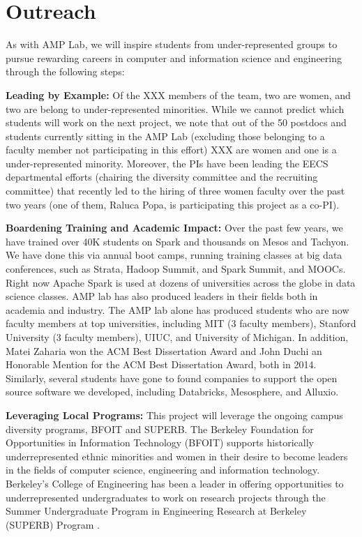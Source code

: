 \section{Outreach}

As with AMP Lab, we will inspire students from under-represented groups to pursue rewarding careers in computer and information science and engineering through the following steps:

{\bf Leading by Example:} Of the XXX members of the  team, two are women, and two are belong to under-represented minorities.  While we cannot predict which students will work on the next project, we note that out of the 50 postdocs and students currently sitting in the AMP Lab (excluding those belonging to a faculty member not participating in this effort) XXX are women and one is a under-represented minority.  Moreover, the PIs have been leading the EECS departmental efforts (chairing the diversity committee and the recruiting committee) that recently led to the hiring of three women faculty over the past two years (one of them, Raluca Popa, is participating this project as a co-PI).

{\bf Boardening Training and Academic Impact:} Over the past few years, we have trained over 40K students on Spark and thousands on Mesos and Tachyon. We have done this via annual boot camps, running training classes at big data conferences, such as Strata, Hadoop Summit, and Spark Summit, and MOOCs.  Right now Apache Spark is used at dozens of universities across the globe in data science classes. AMP lab has also produced leaders in their fields both in academia and  industry. The AMP lab alone has produced students who are now faculty members at top universities, including MIT (3 faculty members), Stanford University (3 faculty members), UIUC, and University of Michigan. In addition, Matei Zaharia won the ACM Best Dissertation Award and John Duchi an Honorable Mention for the ACM Best Dissertation Award, both in 2014. Similarly, several students have gone to found companies to support the open source software we developed, including Databricks, Mesosphere, and Alluxio. 

{\bf Leveraging  Local Programs:} This project will leverage the ongoing campus diversity programs, BFOIT and SUPERB. The Berkeley Foundation for Opportunities in Information Technology (BFOIT) \cite{bfoit} supports historically underrepresented ethnic minorities and women in their desire to become leaders in the fields of computer science, engineering and information technology. 
Berkeley's College of Engineering has been a leader in offering opportunities to underrepresented undergraduates to work on research projects through the Summer Undergraduate Program in Engineering Research at Berkeley (SUPERB) Program \cite{superb}.  

